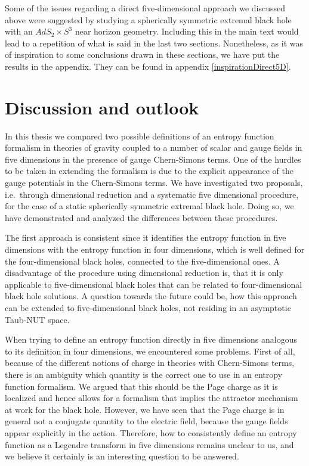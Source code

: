 \documentclass[12pt,twoside]{book}
\begin{document}
\noindent
Some of the issues regarding a direct five-dimensional approach we discussed above were suggested by studying a spherically symmetric extremal black hole with an $AdS_{2} \times S^{3}$ near horizon geometry. Including this in the main text would lead to a repetition of what is said in the last two sections. Nonetheless, as it was of inspiration to some conclusions drawn in these sections, we have put the results in the appendix. They can be found in appendix \ref{inspirationDirect5D}.

\newpage
\thispagestyle{empty}
\chapter{Discussion and outlook}

In this thesis we compared two possible definitions of an entropy function formalism in theories of gravity coupled to a number of scalar and gauge fields in five dimensions in the presence of gauge Chern-Simons terms. One of the hurdles to be taken in extending the formalism is due to the explicit appearance of the gauge potentials in the Chern-Simons terms. We have investigated two proposals, i.e.\ through dimensional reduction and a systematic five dimensional procedure, for the case of a static spherically symmetric extremal black hole. Doing so, we have demonstrated and analyzed the differences between these procedures.

The first approach is consistent since it identifies the entropy function in five dimensions with the entropy function in four dimensions, which is well defined for the four-dimensional black holes, connected to the five-dimensional ones. A disadvantage of the procedure using dimensional reduction is, that it is only applicable to five-dimensional black holes that can be related to four-dimensional black hole solutions. A question towards the future could be, how this approach can be extended to five-dimensional black holes, not residing in an asymptotic Taub-NUT space.

When trying to define an entropy function directly in five dimensions analogous to its definition in four dimensions, we encountered some problems. First of all, because of the different notions of charge in theories with Chern-Simons terms, there is an ambiguity which quantity is the correct one to use in an entropy function formalism. We argued that this should be the Page charge as it is localized and hence allows for a formalism that implies the attractor mechanism at work for the black hole. However, we have seen that the Page charge is in general not a conjugate quantity to the electric field, because the gauge fields appear explicitly in the action. Therefore, how to consistently define an entropy function as a Legendre transform in five dimensions remains unclear to us, and we believe it certainly is an interesting question to be answered.
\end{document}
